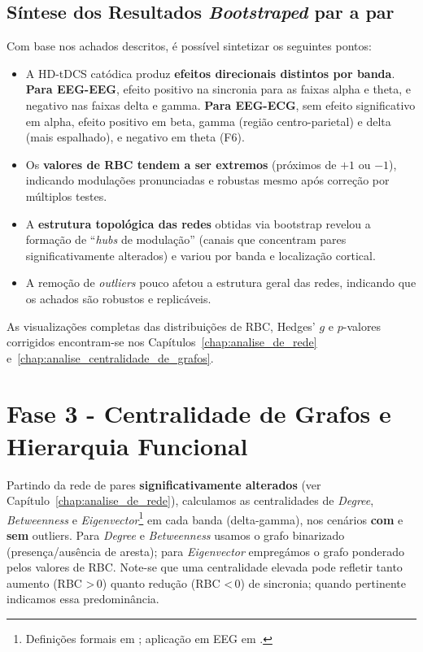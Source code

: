\subsection{Síntese dos Resultados \textit{Bootstraped} par a par}
Com base nos achados descritos, é possível sintetizar os seguintes pontos:
\begin{itemize}
  \item A HD-tDCS catódica produz \textbf{efeitos direcionais distintos por banda}. \textbf{Para EEG-EEG}, efeito positivo na sincronia para as faixas alpha e theta, e negativo nas faixas delta e gamma. \textbf{Para EEG-ECG}, sem efeito significativo em alpha, efeito positivo em beta, gamma (região centro-parietal) e delta (mais espalhado), e negativo em theta (F6).
  \item Os \textbf{valores de RBC tendem a ser extremos} (próximos de $+1$ ou $-1$), indicando modulações pronunciadas e robustas mesmo após correção por múltiplos testes.
  \item A \textbf{estrutura topológica das redes} obtidas via bootstrap revelou a formação de ``\textit{hubs} de modulação'' (canais que concentram pares significativamente alterados) e variou por banda e localização cortical.
  \item A remoção de \textit{outliers} pouco afetou a estrutura geral das redes, indicando que os achados são robustos e replicáveis.
\end{itemize}

As visualizações completas das distribuições de RBC, Hedges' $g$ e $p$-valores corrigidos encontram-se nos Capítulos~\ref{chap:analise_de_rede} e~\ref{chap:analise_centralidade_de_grafos}.

\section{Fase 3 - Centralidade de Grafos e Hierarquia Funcional}
\label{sec:fase3_centralidade}

Partindo da rede de pares \textbf{significativamente alterados} (ver Capítulo~\ref{chap:analise_de_rede}), calculamos as centralidades de \textit{Degree}, \textit{Betweenness} e \textit{Eigenvector}\footnote{Definições formais em \cite{rubinov2010complex,bullmore2009complex}; aplicação em EEG em .} em cada banda (delta-gamma), nos cenários \textbf{com} e \textbf{sem} outliers. Para \textit{Degree} e \textit{Betweenness} usamos o grafo binarizado (presença/ausência de aresta); para \textit{Eigenvector} empregámos o grafo ponderado pelos valores de RBC. Note-se que uma centralidade elevada pode refletir tanto aumento (RBC >\,0) quanto redução (RBC <\,0) de sincronia; quando pertinente indicamos essa predominância.

